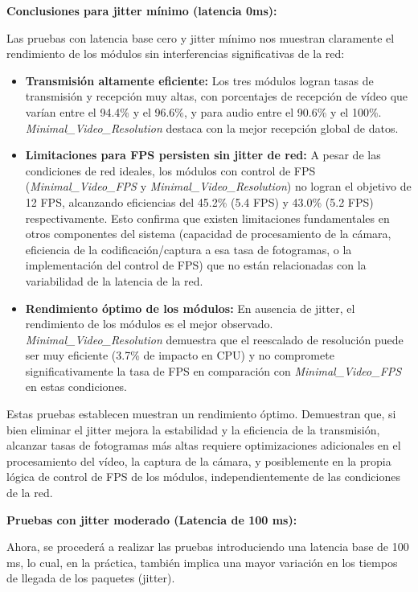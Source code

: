 \textbf{Conclusiones para jitter mínimo (latencia 0ms):}

Las pruebas con latencia base cero y jitter mínimo nos muestran claramente el rendimiento de los módulos sin interferencias significativas de la red:

\begin{itemize}
\item \textbf{Transmisión altamente eficiente:} Los tres módulos logran tasas de transmisión y recepción muy altas, con porcentajes de recepción de vídeo que varían entre el 94.4\% y el 96.6\%, y para audio entre el 90.6\% y el 100\%. \textit{Minimal\_Video\_Resolution} destaca con la mejor recepción global de datos.
\item \textbf{Limitaciones para FPS persisten sin jitter de red:} A pesar de las condiciones de red ideales, los módulos con control de FPS (\textit{Minimal\_Video\_FPS} y \textit{Minimal\_Video\_Resolution}) no logran el objetivo de 12 FPS, alcanzando eficiencias del 45.2\% (5.4 FPS) y 43.0\% (5.2 FPS) respectivamente. Esto confirma que existen limitaciones fundamentales en otros componentes del sistema (capacidad de procesamiento de la cámara, eficiencia de la codificación/captura a esa tasa de fotogramas, o la implementación del control de FPS) que no están relacionadas con la variabilidad de la latencia de la red.
\item \textbf{Rendimiento óptimo de los módulos:} En ausencia de jitter, el rendimiento de los módulos es el mejor observado. \textit{Minimal\_Video\_Resolution} demuestra que el reescalado de resolución puede ser muy eficiente (3.7\% de impacto en CPU) y no compromete significativamente la tasa de FPS en comparación con \textit{Minimal\_Video\_FPS} en estas condiciones.
\end{itemize}

Estas pruebas establecen muestran un rendimiento óptimo. Demuestran que, si bien eliminar el jitter mejora la estabilidad y la eficiencia de la transmisión, alcanzar tasas de fotogramas más altas requiere optimizaciones adicionales en el procesamiento del vídeo, la captura de la cámara, y posiblemente en la propia lógica de control de FPS de los módulos, independientemente de las condiciones de la red.
\newpage

\textbf{Pruebas con jitter moderado (Latencia de 100 ms):}
\vspace{\baselineskip}

Ahora, se procederá a realizar las pruebas introduciendo una latencia base de 100 ms, lo cual, en la práctica, también implica una mayor variación en los tiempos de llegada de los paquetes (jitter).
\vspace{\baselineskip}

